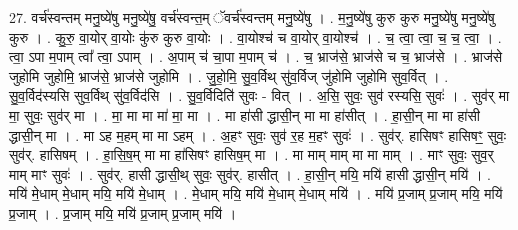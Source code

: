 \documentclass[17pt]{extarticle}
\begin{document}
27. वर्च॑स्वन्तम् मनु॒ष्ये॑षु मनु॒ष्ये॑षु॒ वर्च॑स्वन्त॒म् ॅवर्च॑स्वन्तम् मनु॒ष्ये॑षु । . म॒नु॒ष्ये॑षु कुरु कुरु मनु॒ष्ये॑षु मनु॒ष्ये॑षु कुरु । . कु॒रु॒ वा॒योर् वा॒योः कु॑रु कुरु वा॒योः । . वा॒योश्च॑ च वा॒योर् वा॒योश्च॑ । . च॒ त्वा॒ त्वा॒ च॒ च॒ त्वा॒ । . त्वा॒ ऽपा म॒पाम् त्वा᳚ त्वा॒ ऽपाम् । . अ॒पाम् च॑ चा॒पा म॒पाम् च॑ । . च॒ भ्राज॑से॒ भ्राज॑से च च॒ भ्राज॑से । . भ्राज॑से जुहोमि जुहोमि॒ भ्राज॑से॒ भ्राज॑से जुहोमि । . जु॒हो॒मि॒ सु॒व॒र्विथ् सु॑व॒र्विज् जु॑होमि जुहोमि सुव॒र्वित् । . सु॒व॒र्विद॑स्यसि सुव॒र्विथ् सु॑व॒र्विद॑सि । . सु॒व॒र्विदिति॑ सुवः - वित् । . अ॒सि॒ सुवः॒ सुव॑ रस्यसि॒ सुवः॑ । . सुव॑र् मा मा॒ सुवः॒ सुव॑र् मा । . मा॒ मा मा मा॑ मा॒ मा । . मा हा॑सी द्धासी॒न् मा मा हा॑सीत् । . हा॒सी॒न् मा मा हा॑सी द्धासी॒न् मा । . मा ऽह म॒हम् मा मा ऽहम् । . अ॒हꣳ सुवः॒ सुव॑ र॒ह म॒हꣳ सुवः॑ । . सुव॑र्. हासिषꣳ हासिषꣳ॒॒ सुवः॒ सुव॑र्. हासिषम् । . हा॒सि॒ष॒म् मा मा हा॑सिषꣳ हासिष॒म् मा । . मा माम् माम् मा मा माम् । . माꣳ सुवः॒ सुव॒र् माम् माꣳ सुवः॑ । . सुव॑र्. हासी द्धासी॒थ् सुवः॒ सुव॑र्. हासीत् । . हा॒सी॒न् मयि॒ मयि॑ हासी द्धासी॒न् मयि॑ । . मयि॑ मे॒धाम् मे॒धाम् मयि॒ मयि॑ मे॒धाम् । . मे॒धाम् मयि॒ मयि॑ मे॒धाम् मे॒धाम् मयि॑ । . मयि॑ प्र॒जाम् प्र॒जाम् मयि॒ मयि॑ प्र॒जाम् । . प्र॒जाम् मयि॒ मयि॑ प्र॒जाम् प्र॒जाम् मयि॑ । \newline
\end{document}
